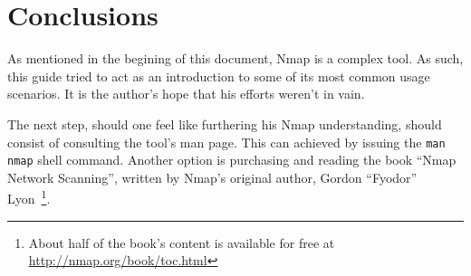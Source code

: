 \documentclass[a4paper,oneside,12pt]{book}
\begin{document}
\chapter*{Conclusions}
 

As mentioned in the begining of this document, Nmap is a complex tool. As such, this guide tried to act as an introduction to some of its most common usage scenarios. It is the author's hope that his efforts weren't in vain.

The next step, should one feel like furthering his Nmap understanding, should consist of consulting the tool's man page. This can achieved by issuing the \texttt{man nmap} shell command. Another option is purchasing and reading the book ``Nmap Network Scanning'', written by Nmap's original author, Gordon ``Fyodor'' Lyon~\footnote{About half of the book's content is available for free at \url{http://nmap.org/book/toc.html}}.
\end{document}
